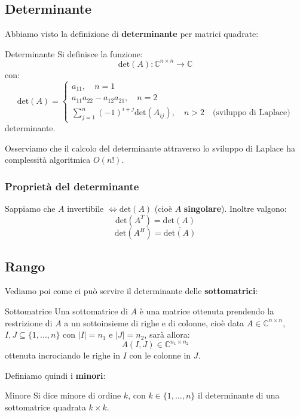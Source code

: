 \documentclass[a4paper,11pt]{article}
\begin{document}
\subsection{Determinante}
Abbiamo visto la definizione di \textbf{determinante} per matrici quadrate:
\begin{definition}{Determinante}
	Si definisce la funzione:
	$$
		\mathrm{det}(A) : \mathbb{C}^{n \times n} \rightarrow \mathbb{C}
	$$
	con:
	$$
		\mathrm{det}(A) =
			\begin{cases}
				a_{11}, \quad n = 1 \\ 
				a_11 a_22 - a_12 a_21, \quad n =2 \\ 
				\sum_{j = 1}^n (-1)^{i + j} \mathrm{det}(A_{ij}), \quad n > 2 \quad \text{(sviluppo di Laplace)}
			\end{cases}
	$$
	determinante.
\end{definition}

Osserviamo che il calcolo del determinante attraverso lo sviluppo di Laplace ha complessità algoritmica $O(n!)$.

\subsubsection{Proprietà del determinante}
Sappiamo che $A$ invertibile $\Leftrightarrow \mathrm{det}(A)$ (cioè $A$ \textbf{singolare}).
Inoltre valgono:
$$
\mathrm{det}(A^T) = \mathrm{det}(A)
$$
$$
\mathrm{det}(A^H) = \overline{\mathrm{det}(A)}
$$

\subsection{Rango}
Vediamo poi come ci può servire il determinante delle \textbf{sottomatrici}:
\begin{definition}{Sottomatrice}
	Una sottomatrice di $A$ è una matrice ottenuta prendendo la restrizione di $A$ a un sottoinsieme di righe e di colonne, cioè data $A \in \mathbb{C}^{n \times n}$, $I, J \subseteq \{ 1, ..., n \}$ con $|I| = n_1$ e $|J| = n_2$, sarà allora:
	$$
		A(I, J) \in \mathbb{C}^{n_1 \times n_2}
	$$
	ottenuta incrociando le righe in $I$ con le colonne in $J$.
\end{definition}

Definiamo quindi i \textbf{minori}:
\begin{definition}{Minore}
	Si dice minore di ordine $k$, con $k \in \{ 1, ..., n \}$ il determinante di una sottomatrice quadrata $k \times k$.
\end{definition}
\end{document}
